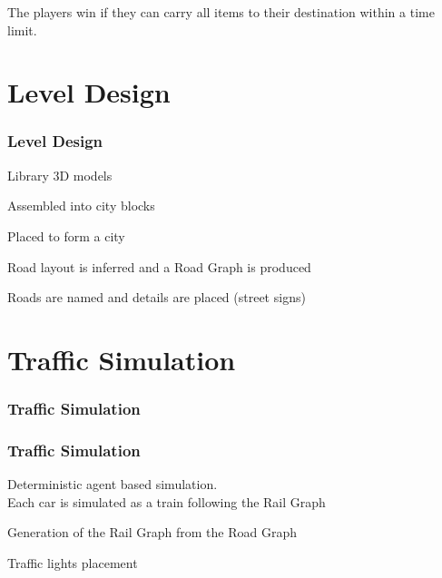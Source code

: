 \documentclass{beamer}
\begin{document}
\begin{frame}
The players win if they can carry all items to their destination within a time limit.
\end{frame}

\section{Level Design}

\begin{frame}
\frametitle{Level Design}
\end{frame}

\begin{frame}
	Library 3D models
\end{frame}

\begin{frame}
	Assembled into city blocks
\end{frame}

\begin{frame}
	Placed to form a city
\end{frame}

\begin{frame}
	Road layout is inferred and a Road Graph is produced
\end{frame}

\begin{frame}
	Roads are named and details are placed (street signs)
\end{frame}

\section{Traffic Simulation}

\begin{frame}
\frametitle{Traffic Simulation}
\end{frame}

\begin{frame}
	\frametitle{Traffic Simulation}
	Deterministic agent based simulation. \\
	Each car is simulated as a train following the Rail Graph
\end{frame}

\begin{frame}
	Generation of the Rail Graph from the Road Graph	
\end{frame}

\begin{frame}
	Traffic lights placement	
\end{frame}
\end{document}
